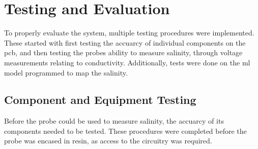 \chapter{Testing and Evaluation}

To properly evaluate the system, multiple testing procedures were implemented.
These started with first testing the accuarcy of individual components on the \gls{pcb}, and then testing the probes ability to measure salinity, through voltage measurements relating to conductivity.
Additionally, tests were done on the \gls{ml} model programmed to map the salinity.

\section{Component and Equipment Testing}
Before the probe could be used to measure salinity, the accuarcy of its components needed to be tested.
These procedures were completed before the probe was encased in resin, as access to the circuitry was required.

